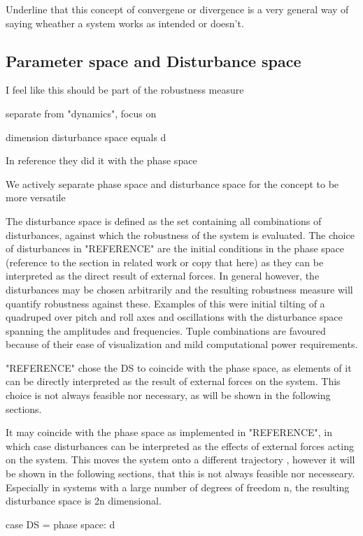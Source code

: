     Underline that this concept of convergene or divergence is a very general way of saying wheather a system works as intended or doesn't. 

\subsection{ Parameter space and Disturbance space}
    
    
    I feel like this should be part of the robustness measure

    separate from "dynamics", focus on 

    dimension disturbance space equals d

    In reference they did it with the phase space  

    We actively separate phase space and disturbance space for the concept to be more versatile

    The disturbance space is defined as the set containing all combinations of disturbances, against which the robustness of the system is evaluated. The choice of disturbances in "REFERENCE" are the initial conditions in the phase space (reference to the section in related work or copy that here) as they can be interpreted as the direct result of external forces. In general however, the disturbances may be chosen arbitrarily and the resulting robustness measure will quantify robustness against these. Examples of this were initial tilting of a quadruped over pitch and roll axes and oscillations with the disturbance space spanning the amplitudes and frequencies. Tuple combinations are favoured because of their ease of visualization and mild computational power requirements.  

    "REFERENCE" chose the DS to coincide with the phase space, as elements of it can be directly interpreted as the result of external forces on the system. This choice is not always feasible nor necessary, as will be shown in the following sections. 

    It may coincide with the phase space as implemented in "REFERENCE", in which case disturbances can be interpreted as the effects of external forces acting on the system. This moves the system onto a different trajectory 
    , however it will be shown in the following sections, that this is not always feasible nor necesseary. Especially in systems with a large number of degrees of freedom n, the resulting disturbance space is 2n dimensional. 

    case DS = phase space: d

